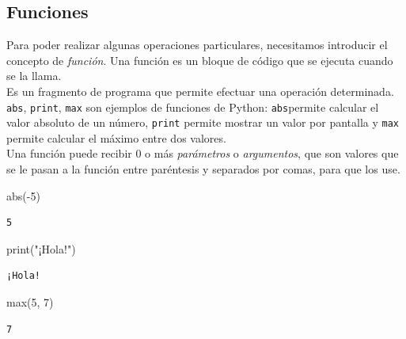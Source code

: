 \documentclass[
  letterpaper,
  DIV=11,
  numbers=noendperiod]{scrreprt}
\newenvironment{Shaded}{\begin{snugshade}}{\end{snugshade}}
\newcommand{\BuiltInTok}[1]{\textcolor[rgb]{0.00,0.23,0.31}{#1}}
\newcommand{\DecValTok}[1]{\textcolor[rgb]{0.68,0.00,0.00}{#1}}
\newcommand{\NormalTok}[1]{\textcolor[rgb]{0.00,0.23,0.31}{#1}}
\newcommand{\OperatorTok}[1]{\textcolor[rgb]{0.37,0.37,0.37}{#1}}
\newcommand{\StringTok}[1]{\textcolor[rgb]{0.13,0.47,0.30}{#1}}
\begin{document}
\hypertarget{funciones}{%
\subsection{Funciones}\label{funciones}}

Para poder realizar algunas operaciones particulares, necesitamos
introducir el concepto de \emph{función}. Una función es un bloque de
código que se ejecuta cuando se la llama.\\
Es un fragmento de programa que permite efectuar una operación
determinada. \texttt{abs}, \texttt{print}, \texttt{max} son ejemplos de
funciones de Python: \texttt{abs}permite calcular el valor absoluto de
un número, \texttt{print} permite mostrar un valor por pantalla y
\texttt{max} permite calcular el máximo entre dos valores.\\

Una función puede recibir 0 o más \emph{parámetros} o \emph{argumentos},
que son valores que se le pasan a la función entre paréntesis y
separados por comas, para que los use.\\

\begin{Shaded}
\begin{Highlighting}[]
\BuiltInTok{abs}\NormalTok{(}\OperatorTok{{-}}\DecValTok{5}\NormalTok{)}
\end{Highlighting}
\end{Shaded}

\begin{verbatim}
5
\end{verbatim}

\begin{Shaded}
\begin{Highlighting}[]
\BuiltInTok{print}\NormalTok{(}\StringTok{"¡Hola!"}\NormalTok{)}
\end{Highlighting}
\end{Shaded}

\begin{verbatim}
¡Hola!
\end{verbatim}

\begin{Shaded}
\begin{Highlighting}[]
\BuiltInTok{max}\NormalTok{(}\DecValTok{5}\NormalTok{, }\DecValTok{7}\NormalTok{)}
\end{Highlighting}
\end{Shaded}

\begin{verbatim}
7
\end{verbatim}
\end{document}
